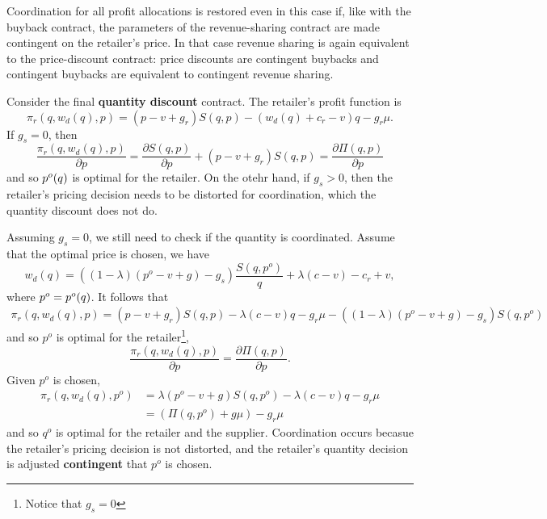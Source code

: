 Coordination for all profit allocations is restored even in this case if, like with the buyback contract, the parameters of the revenue-sharing contract are made contingent on the retailer's price. In that case revenue sharing is again equivalent to the price-discount contract: price discounts are contingent buybacks and contingent buybacks are equivalent to contingent revenue sharing.

Consider the final \textbf{quantity discount} contract. The retailer's profit function is 
\begin{equation*}
    \pi_r(q,w_d(q),p)=(p-v+g_r)S(q,p)-(w_d(q)+c_r-v)q-g_r\mu.
\end{equation*}
If $g_s=0$, then 
\begin{equation*}
    \frac{\pi_r(q,w_d(q),p)}{\partial p}=\frac{\partial S(q,p)}{\partial p}+(p-v+g_r)S(q,p)=\frac{\partial \Pi(q,p)}{\partial p}
\end{equation*}
and so $p^o(q)$ is optimal for the retailer. On the otehr hand, if $g_s>0$, then the retailer's pricing decision needs to be distorted for coordination, which the quantity discount does not do.

Assuming $g_s=0$, we still need to check if the quantity is coordinated. Assume that the optimal price is chosen, we have 
\begin{equation*}
    w_d(q)=((1-\lambda)(p^o-v+g)-g_s)\frac{S(q,p^o)}{q}+\lambda(c-v)-c_r+v,
\end{equation*}
where $p^o=p^o(q)$. It follows that 
\begin{align*}
    \pi_r(q,w_d(q),p)=(p-v+g_r)S(q,p)-\lambda(c-v)q-g_r\mu-((1-\lambda)(p^o-v+g)-g_s)S(q,p^o)
\end{align*}
and so $p^o$ is optimal for the retailer\footnote{Notice that $g_s=0$}, 
\begin{equation*}
    \frac{\pi_r(q,w_d(q),p)}{\partial p}=\frac{\partial\Pi(q,p)}{\partial p}.
\end{equation*}
Given $p^o$ is chosen,
\begin{align*}
    \pi_r(q,w_d(q),p^o)&=\lambda(p^o-v+g)S(q,p^o)-\lambda(c-v)q-g_r\mu\\
    &=(\Pi(q,p^o)+g\mu)-g_r\mu
\end{align*}
and so $q^o$ is optimal for the retailer and the supplier. Coordination occurs becasue the retailer's pricing decision is not distorted, and the retailer's quantity decision is adjusted \textbf{contingent} that $p^o$ is chosen.

